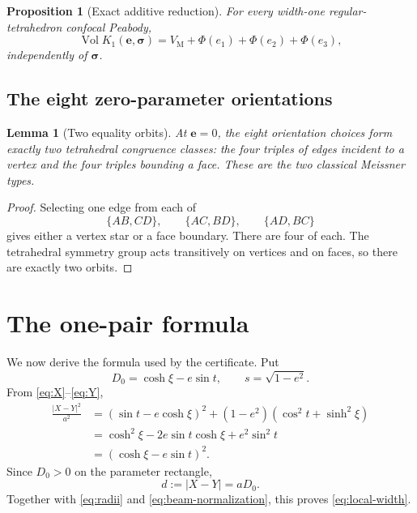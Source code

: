 \documentclass[11pt]{article}
\numberwithin{equation}{section}
\newtheorem{proposition}[theorem]{Proposition}
\newtheorem{lemma}[theorem]{Lemma}
\theoremstyle{remark}
\newcommand{\Vol}{\operatorname{Vol}}
\newcommand{\VM}{V_{\mathrm M}}
\begin{document}
\begin{proposition}[Exact additive reduction]
\label{prop:additive}
For every width-one regular-tetrahedron confocal Peabody,
\begin{equation}
  \Vol K_1(\mathbf e,\boldsymbol\sigma)
  =\VM+\Phi(e_1)+\Phi(e_2)+\Phi(e_3),
  \label{eq:additive-volume}
\end{equation}
independently of \(\boldsymbol\sigma\).
\end{proposition}

\subsection{The eight zero-parameter orientations}

\begin{lemma}[Two equality orbits]
\label{lem:orientation-orbits}
At \(\mathbf e=0\), the eight orientation choices form exactly two tetrahedral congruence classes: the four triples of edges incident to a vertex and the four triples bounding a face.  These are the two classical Meissner types.
\end{lemma}

\begin{proof}
Selecting one edge from each of
\[
  \{AB,CD\},\qquad \{AC,BD\},\qquad \{AD,BC\}
\]
gives either a vertex star or a face boundary.  There are four of each.  The tetrahedral symmetry group acts transitively on vertices and on faces, so there are exactly two orbits.
\end{proof}

\section{The one-pair formula}
\label{sec:pair}

We now derive the formula used by the certificate.  Put
\[
  D_0=\cosh\xi-e\sin t,
  \qquad s=\sqrt{1-e^2}.
\]
From \eqref{eq:X}--\eqref{eq:Y},
\begin{align*}
  \frac{|X-Y|^2}{a^2}
  &=(\sin t-e\cosh\xi)^2
    +(1-e^2)(\cos^2t+\sinh^2\xi)\\
  &=\cosh^2\xi-2e\sin t\cosh\xi+e^2\sin^2t\\
  &=(\cosh\xi-e\sin t)^2.
\end{align*}
Since \(D_0>0\) on the parameter rectangle,
\begin{equation}
  d:=|X-Y|=aD_0.
  \label{eq:d}
\end{equation}
Together with \eqref{eq:radii} and \eqref{eq:beam-normalization}, this proves \eqref{eq:local-width}.
\end{document}

